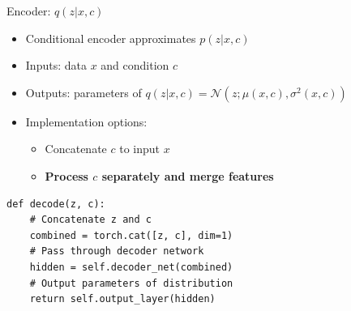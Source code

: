 \documentclass[5pt,aspectratio=169]{beamer}
\begin{document}
\begin{frame}{Encoder: $q(z|x,c)$}
\begin{itemize}
\item Conditional encoder approximates $p(z|x,c)$
\item Inputs: data $x$ and condition $c$
\item Outputs: parameters of $q(z|x,c) = \mathcal{N}(z; \mu(x,c), \sigma^2(x,c))$
\item Implementation options:
  \begin{itemize}
  \item Concatenate $c$ to input $x$
  \item \textbf{Process $c$ separately and merge features}
  \end{itemize}
\end{itemize}

\begin{center}
\end{center}
\end{frame}


\begin{frame}[fragile]
\centering
\begin{lstlisting}
def decode(z, c):
    # Concatenate z and c
    combined = torch.cat([z, c], dim=1)
    # Pass through decoder network
    hidden = self.decoder_net(combined)
    # Output parameters of distribution
    return self.output_layer(hidden)
\end{lstlisting}
\end{frame}
\end{document}
